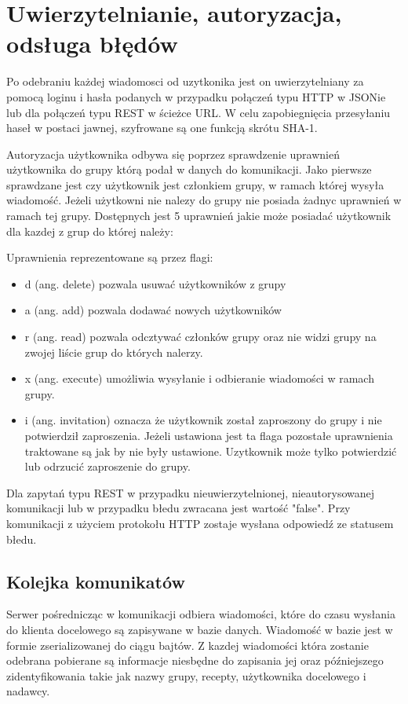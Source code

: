\documentclass[11pt,a4paper,polish,thesis]{dcsbook}
\begin{document}
\section{Uwierzytelnianie, autoryzacja, odsługa błędów} 
Po odebraniu każdej wiadomosci od uzytkonika jest on uwierzytelniany za pomocą loginu i hasła podanych w przypadku połączeń typu HTTP w JSONie lub dla połączeń typu REST w ścieżce URL.
W celu zapobiegnięcia przesyłaniu haseł w postaci jawnej, szyfrowane są one funkcją skrótu SHA-1.

Autoryzacja użytkownika odbywa się poprzez sprawdzenie uprawnień użytkownika do grupy którą podał w danych do komunikacji. 
Jako pierwsze sprawdzane jest czy użytkownik jest członkiem grupy, w ramach której wysyła wiadomość. 
Jeżeli użytkowni nie nalezy do grupy nie posiada żadnyc uprawnień w ramach tej grupy.
Dostępnych jest 5 uprawnień jakie może posiadać użytkownik dla kazdej z grup do której należy:

Uprawnienia reprezentowane są przez flagi:
\begin{itemize}
\item d (ang. delete) pozwala usuwać użytkowników z grupy
\item a (ang. add) pozwala dodawać nowych użytkowników
\item r (ang. read) pozwala odcztywać członków grupy oraz nie widzi grupy na zwojej liście grup do których nalerzy.
\item x (ang. execute) umożliwia wysyłanie i odbieranie wiadomości w ramach grupy.
\item i (ang. invitation) oznacza że użytkownik został zaproszony do grupy i nie potwierdził zaproszenia. Jeżeli ustawiona jest ta flaga pozostałe uprawnienia traktowane są jak by nie były ustawione. Uzytkownik może tylko potwierdzić lub odrzucić zaproszenie do grupy.
\end{itemize}
Dla zapytań typu REST w przypadku nieuwierzytelnionej, nieautorysowanej komunikacji lub w przypadku błedu zwracana jest wartość "false".
Przy komunikacji z użyciem protokołu HTTP zostaje wysłana odpowiedź ze statusem błedu.

\subsection{Kolejka komunikatów}
Serwer pośrednicząc w komunikacji odbiera wiadomości, które do czasu wysłania do klienta docelowego są zapisywane w bazie danych.
Wiadomość w bazie jest w formie zserializowanej do ciągu bajtów.
Z kazdej wiadomości która zostanie odebrana pobierane są informacje niesbędne do zapisania jej oraz późniejszego zidentyfikowania takie jak nazwy grupy, recepty, użytkownika docelowego i nadawcy.
\end{document}
